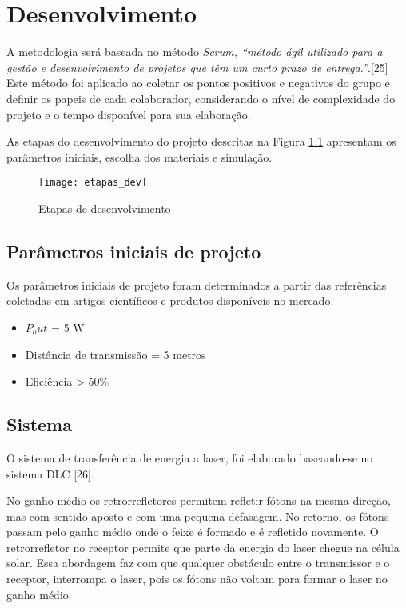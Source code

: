 \chapter{Desenvolvimento}

A metodologia será baseada no método \emph{Scrum, ``método ágil utilizado para a gestão e desenvolvimento de projetos que têm um curto prazo de entrega.''}.[25] Este método foi aplicado ao coletar os pontos positivos e negativos do grupo e definir os papeis de cada colaborador, considerando o nível de complexidade do projeto e o tempo disponível para sua elaboração.

As etapas do desenvolvimento do projeto descritas na Figura \ref{fig:etapas_dev} apresentam os parâmetros iniciais, escolha dos materiais e simulação. 

\begin{figure}[ht!]
\centering
\caption{Etapas de desenvolvimento}
\label{fig:etapas_dev}
\texttt{[image: etapas\_dev]}
\end{figure}

\section{Parâmetros iniciais de projeto}

Os parâmetros iniciais de projeto foram determinados a partir das referências coletadas em artigos científicos e produtos disponíveis no mercado.

\begin{itemize}
	\item \mbox{$P_out$} = 5 W
	\item Distância de transmissão = 5 metros
	\item Eficiência > 50\%
\end{itemize}

\section{Sistema}

O sistema de transferência de energia a laser, foi elaborado baseando-se no sistema DLC [26].

No ganho médio os retrorrefletores permitem refletir fótons na mesma direção, mas com sentido aposto e com uma pequena defasagem. No retorno, os fótons passam pelo ganho médio onde o feixe é formado e é refletido novamente. O retrorrefletor no receptor permite que parte da energia do laser chegue na célula solar. Essa abordagem faz com que qualquer obstáculo entre o transmissor e o receptor, interrompa o laser, pois os fótons não voltam para formar o laser no ganho médio.


